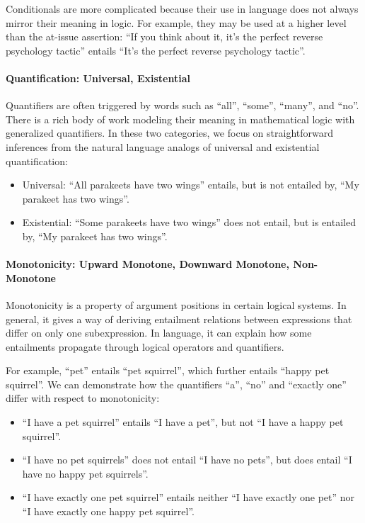 \documentclass{article} \usepackage{iclr2019_conference,times}
\begin{document}
Conditionals are more complicated because their use in language does not always mirror their meaning in logic. For example, they may be used at a higher level than the at-issue assertion: ``If you think about it, it's the perfect reverse psychology tactic'' entails ``It's the perfect reverse psychology tactic''.

\paragraph{Quantification: Universal, Existential} Quantifiers are often triggered by words such as ``all'', ``some'', ``many'', and ``no''. There is a rich body of work modeling their meaning in mathematical logic with generalized quantifiers. In these two categories, we focus on straightforward inferences from the natural language analogs of universal and existential quantification:
\begin{itemize}
    \item Universal: ``All parakeets have two wings'' entails, but is not entailed by, ``My parakeet has two wings''.
    \item Existential: ``Some parakeets have two wings'' does not entail, but is entailed by, ``My parakeet has two wings''.
\end{itemize}

\paragraph{Monotonicity: Upward Monotone, Downward Monotone, Non-Monotone}

Monotonicity is a property of argument positions in certain logical systems. In general, it gives a way of deriving entailment relations between expressions that differ on only one subexpression. In language, it can explain how some entailments propagate through logical operators and quantifiers.

For example, ``pet'' entails ``pet squirrel'', which further entails ``happy pet squirrel''. We can demonstrate how the quantifiers ``a'', ``no'' and ``exactly one'' differ with respect to monotonicity:
\begin{itemize}
    \item ``I have a pet squirrel'' entails ``I have a pet'', but not ``I have a happy pet squirrel''.
    \item ``I have no pet squirrels'' does not entail ``I have no pets'', but does entail ``I have no happy pet squirrels''.
    \item ``I have exactly one pet squirrel'' entails neither ``I have exactly one pet'' nor ``I have exactly one happy pet squirrel''.
\end{itemize}
\end{document}
